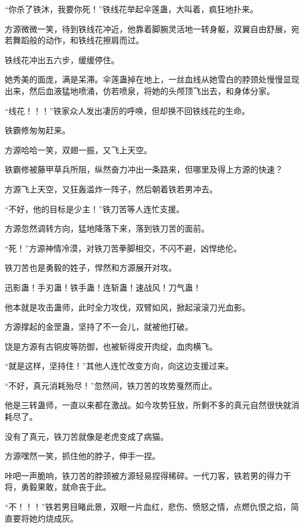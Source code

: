 
\begin{this_body}

“你杀了铁沐，我要你死！”铁线花举起伞莲蛊，大叫着，疯狂地扑来。

方源微微一笑，待到铁线花冲近，他靠着脚腕灵活地一转身躯，双翼自由舒展，宛若舞蹈般的动作，和铁线花擦肩而过。

铁线花冲出五六步，缓缓停住。

她秀美的面庞，满是呆滞。伞莲蛊掉在地上，一丝血线从她雪白的脖颈处慢慢显现出来，然后血液猛地喷涌，仿若喷泉，将她的头颅顶飞出去，和身体分家。

“线花！！！”铁家众人发出凄厉的呼唤，但却换不回铁线花的生命。

铁霸修匆匆赶来。

方源哈哈一笑，双翅一振，又飞上天空。

铁霸修被藤甲草兵所阻，纵然奋力冲出一条路来，但哪里及得上方源的快速？

方源飞上天空，又狂轰滥炸一阵子，然后朝着铁若男冲去。

“不好，他的目标是少主！”铁刀苦等人连忙支援。

方源忽然调转方向，猛地降落下来，落到铁刀苦的面前。

“死！”方源神情冷漠，对铁刀苦拳脚相交，不闪不避，凶悍绝伦。

铁刀苦也是勇毅的姓子，悍然和方源展开对攻。

迅影蛊！手刃蛊！铁手蛊！连斩蛊！速战风！刀气蛊！

他本就是攻击蛊师，此时全力攻伐，双臂如风，掀起滚滚刀光血影。

方源撑起的金罡蛊，坚持了不一会儿，就被他打破。

饶是方源有古铜皮等防御，也被斩得皮开肉绽，血肉横飞。

“就是这样，坚持住！”其他人连忙改变方向，向这边支援过来。

“不好，真元消耗殆尽！”忽然间，铁刀苦的攻势戛然而止。

他是三转蛊师，一直以来都在激战。如今攻势狂放，所剩不多的真元自然很快就消耗尽了。

没有了真元，铁刀苦就像是老虎变成了病猫。

方源嘿然一笑，抓住他的脖子，伸手一捏。

咔吧一声脆响，铁刀苦的脖颈被方源轻易捏得稀碎。一代刀客，铁若男的得力干将，勇毅果敢，就命丧于此。

“不！！！”铁若男目睹此景，双眼一片血红，悲伤、愤怒之情，点燃仇恨之焰，简直要将她灼烧成灰。


\end{this_body}
